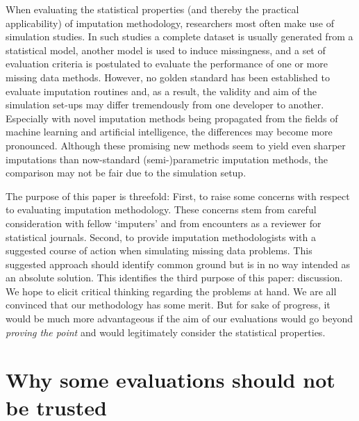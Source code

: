 \documentclass[bimj,fleqn]{w-art}
\begin{document}
When evaluating the statistical properties (and thereby the practical applicability) of imputation methodology, researchers most often make use of simulation studies. In such studies a complete dataset is usually generated from a statistical model, another model is used to induce missingness, and a set of evaluation criteria is postulated to evaluate the performance of one or more missing data methods. However, no golden standard has been established to evaluate imputation routines and, as a result, the validity and aim of the simulation set-ups may differ tremendously from one developer to another. Especially with novel imputation methods being propagated from the fields of machine learning and artificial intelligence, the differences may become more pronounced. Although these promising new methods seem to yield even sharper imputations than now-standard (semi-)parametric imputation methods, the comparison may not be fair due to the simulation setup. 


The purpose of this paper is threefold: First, to raise some concerns with respect to evaluating imputation methodology. These concerns stem from careful consideration with fellow `imputers' and from encounters as a reviewer for statistical journals. Second, to provide imputation methodologists with a suggested course of action when simulating missing data problems. This suggested approach should identify common ground but is in no way intended as an absolute solution. This identifies the third purpose of this paper: discussion. We hope to elicit critical thinking regarding the problems at hand. We are all convinced that our methodology has some merit. But for sake of progress, it would be much more advantageous if the aim of our evaluations would go beyond \textit{proving the point} and would legitimately consider the statistical properties. 



\section{Why some evaluations should not be trusted}
\end{document}

